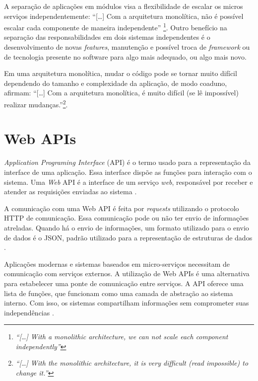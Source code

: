 A separação de aplicações em módulos visa a flexibilidade de escalar os micros serviços independentemente: ``[\dots] Com a arquitetura monolítica, não é possível escalar cada componente de maneira independente'' \cite[p.24, tradução nossa]{dmitry2014micro}\footnote{\textit{``[\dots] With a monolithic architecture, we can not scale each component independently''}}. Outro benefício na separação das responsabilidades em dois sistemas independentes é o desenvolvimento de novas \textit{features}, manutenção e possível troca de \textit{framework} ou de tecnologia presente no software para algo mais adequado, ou algo mais novo. 

Em uma arquitetura monolítica, mudar o código pode se tornar muito difícil dependendo do tamanho e complexidade da aplicação, de modo coaduno,  afirmam: ``[\dots] Com a arquitetura monolítica, é muito difícil (se lê impossível) realizar mudanças.''\cite[p.24, tradução nossa]{dmitry2014micro}\footnote{\textit{``[\dots] With the monolithic architecture, it is very difficult (read impossible) to change it.''}}.

\section{Web APIs}
\label{sec:apis}

\textit{Application Programing Interface} (API) é o termo usado para a representação da interface de uma aplicação. Essa interface dispõe as funções para interação com o sistema. Uma \textit{Web} API é a interface de um serviço \textit{web}, responsável por receber e atender as requisições enviadas ao sistema \cite{masse2011rest, richardson2013restful}.

A comunicação com uma Web API é feita por \textit{requests} utilizando o protocolo HTTP de comunicação. Essa comunicação pode ou não ter envio de informações atreladas. Quando há o envio de informações, um formato utilizado para o envio de dados é o JSON, padrão utilizado para a representação de estruturas de dados \cite{richardson2013restful}.

Aplicações modernas e sistemas baseados em micro-serviços necessitam de comunicação com serviços externos. A utilização de Web APIs é uma alternativa para estabelecer uma ponte de comunicação entre serviços. A API oferece uma lista de funções, que funcionam como uma camada de abstração ao sistema interno. Com isso, os sistemas compartilham informações sem comprometer suas independências \cite{ghebremicael2017transformation}.

